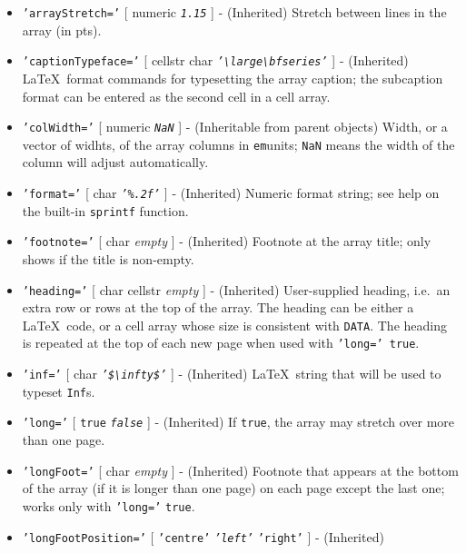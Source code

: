  \begin{itemize}
 \item
   \texttt{'arrayStretch='} {[} numeric \textbar{} \emph{\texttt{1.15}}
   {]} - (Inherited) Stretch between lines in the array (in pts).
 \item
   \texttt{'captionTypeface='} {[} cellstr \textbar{} char \textbar{}
   \emph{\texttt{'\textbackslash{}large\textbackslash{}bfseries'}} {]} -
   (Inherited) \LaTeX~format commands for typesetting the array caption;
   the subcaption format can be entered as the second cell in a cell
   array.
 \item
   \texttt{'colWidth='} {[} numeric \textbar{} \emph{\texttt{NaN}} {]} -
   (Inheritable from parent objects) Width, or a vector of widhts, of the
   array columns in \texttt{em}units; \texttt{NaN} means the width of the
   column will adjust automatically.
 \item
   \texttt{'format='} {[} char \textbar{} \emph{\texttt{'\%.2f'}} {]} -
   (Inherited) Numeric format string; see help on the built-in
   \texttt{sprintf} function.
 \item
   \texttt{'footnote='} {[} char \textbar{} \emph{empty} {]} -
   (Inherited) Footnote at the array title; only shows if the title is
   non-empty.
 \item
   \texttt{'heading='} {[} char \textbar{} cellstr \textbar{}
   \emph{empty} {]} - (Inherited) User-supplied heading, i.e.~an extra
   row or rows at the top of the array. The heading can be either a
   \LaTeX~code, or a cell array whose size is consistent with
   \texttt{DATA}. The heading is repeated at the top of each new page
   when used with \texttt{'long=' true}.
 \item
   \texttt{'inf='} {[} char \textbar{}
   \emph{\texttt{'\$\textbackslash{}infty\$'}} {]} - (Inherited)
   \LaTeX~string that will be used to typeset \texttt{Inf}s.
 \item
   \texttt{'long='} {[} \texttt{true} \textbar{} \emph{\texttt{false}}
   {]} - (Inherited) If \texttt{true}, the array may stretch over more
   than one page.
 \item
   \texttt{'longFoot='} {[} char \textbar{} \emph{empty} {]} -
   (Inherited) Footnote that appears at the bottom of the array (if it is
   longer than one page) on each page except the last one; works only
   with \texttt{'long='} \texttt{true}.
 \item
   \texttt{'longFootPosition='} {[} \texttt{'centre'} \textbar{}
   \emph{\texttt{'left'}} \textbar{} \texttt{'right'} {]} - (Inherited)

\end{itemize}
